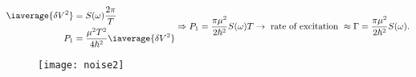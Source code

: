 \begin{equation}\label{noise4}
  \begin{aligned}
    \iaverage{\delta V^2}&=S(\omega)\frac{2\pi}{T}\\
    P_1 &= \frac{\mu^2T^2}{4\hbar^2}\iaverage{\delta V^2}
  \end{aligned}\Rightarrow P_1 = \frac{\pi\mu^2}{2\hbar^2}S(\omega)T \rightarrow \text{ rate of
    excitation } \approx \Gamma = \frac{\pi\mu^2}{2\hbar^2}S(\omega).
\end{equation}


\begin{figure}[h]
  \centering \texttt{[image: noise2]}
\end{figure}

\newpage
